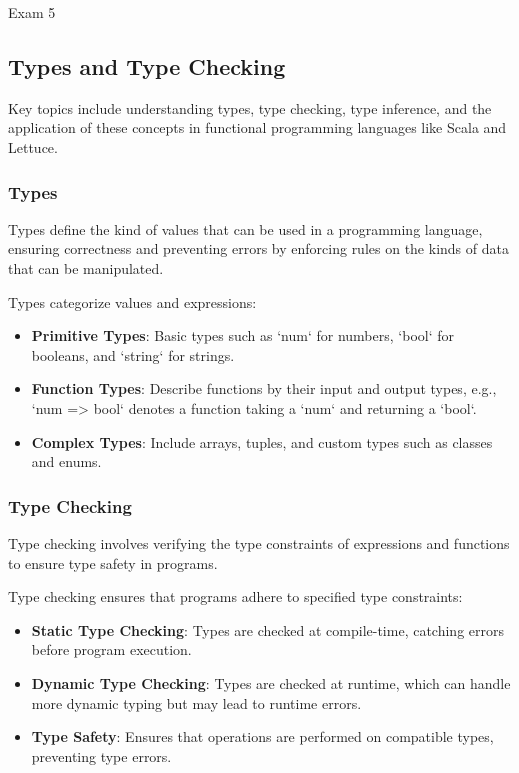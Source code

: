 \begin{examnotes}{Exam 5}
    \subsection*{Types and Type Checking}

    Key topics include understanding types, type checking, type inference, and the application of these concepts in functional programming languages like Scala and Lettuce.
    
    \subsubsection*{Types}
    
    Types define the kind of values that can be used in a programming language, ensuring correctness and preventing errors by enforcing rules on the kinds of data that can be manipulated.
    
    \begin{highlight}
        Types categorize values and expressions:
        \begin{itemize}
            \item \textbf{Primitive Types}: Basic types such as `num` for numbers, `bool` for booleans, and `string` for strings.
            \item \textbf{Function Types}: Describe functions by their input and output types, e.g., `num => bool` denotes a function taking a `num` and returning a `bool`.
            \item \textbf{Complex Types}: Include arrays, tuples, and custom types such as classes and enums.
        \end{itemize}
    \end{highlight}
    
    \subsubsection*{Type Checking}
    
    Type checking involves verifying the type constraints of expressions and functions to ensure type safety in programs.
    
    \begin{highlight}
        Type checking ensures that programs adhere to specified type constraints:
        \begin{itemize}
            \item \textbf{Static Type Checking}: Types are checked at compile-time, catching errors before program execution.
            \item \textbf{Dynamic Type Checking}: Types are checked at runtime, which can handle more dynamic typing but may lead to runtime errors.
            \item \textbf{Type Safety}: Ensures that operations are performed on compatible types, preventing type errors.
        \end{itemize}
    \end{highlight}
    

\end{examnotes}
